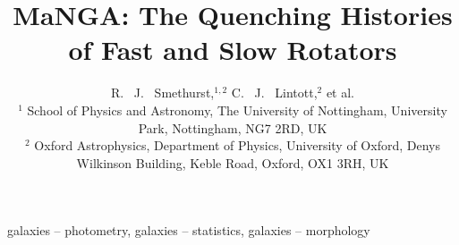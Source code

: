 \documentclass[useAMS,usenatbib]{mn2e}
\begin{document}
\title[Quenching Histories of Fast and Slow Rotators]{MaNGA: The Quenching Histories of Fast and Slow Rotators}
\author[Smethurst et al. 2017]{R. ~J. ~Smethurst,$^{1,2}$ C. ~J. ~Lintott,$^{2}$ et al.
\\ $^1$ School of Physics and Astronomy, The University of Nottingham, University Park, Nottingham, NG7 2RD, UK
\\ $^2$ Oxford Astrophysics, Department of Physics, University of Oxford, Denys Wilkinson Building, Keble Road, Oxford, OX1 3RH, UK
}

\maketitle

\begin{abstract}
\end{abstract}

\begin{keywords}
galaxies -- photometry, galaxies -- statistics, galaxies -- morphology
\end{keywords}



  
\end{document}

